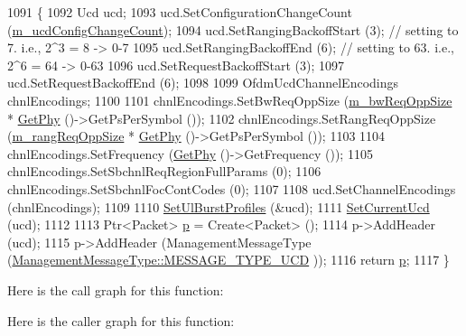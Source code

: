\begin{DoxyCode}
1091 \{
1092   Ucd ucd;
1093   ucd.SetConfigurationChangeCount (\hyperlink{classns3_1_1BaseStationNetDevice_a415c7021411c7acc8f3945acd59a9537}{m\_ucdConfigChangeCount});
1094   ucd.SetRangingBackoffStart (3); \textcolor{comment}{// setting to 7. i.e., 2^3 = 8 -> 0-7}
1095   ucd.SetRangingBackoffEnd (6); \textcolor{comment}{// setting to 63. i.e., 2^6 = 64 -> 0-63}
1096   ucd.SetRequestBackoffStart (3);
1097   ucd.SetRequestBackoffEnd (6);
1098 
1099   OfdmUcdChannelEncodings chnlEncodings;
1100 
1101   chnlEncodings.SetBwReqOppSize (\hyperlink{classns3_1_1BaseStationNetDevice_a15575fd663403b491e36ffe4291ee696}{m\_bwReqOppSize} * \hyperlink{classns3_1_1WimaxNetDevice_a81c1f9d43acfc9cd5d642b784102a21f}{GetPhy} ()->GetPsPerSymbol ());
1102   chnlEncodings.SetRangReqOppSize (\hyperlink{classns3_1_1BaseStationNetDevice_ac4c3cce8984b95e8c708b0402cc697fc}{m\_rangReqOppSize} * \hyperlink{classns3_1_1WimaxNetDevice_a81c1f9d43acfc9cd5d642b784102a21f}{GetPhy} ()->GetPsPerSymbol ());
1103 
1104   chnlEncodings.SetFrequency (\hyperlink{classns3_1_1WimaxNetDevice_a81c1f9d43acfc9cd5d642b784102a21f}{GetPhy} ()->GetFrequency ());
1105   chnlEncodings.SetSbchnlReqRegionFullParams (0);
1106   chnlEncodings.SetSbchnlFocContCodes (0);
1107 
1108   ucd.SetChannelEncodings (chnlEncodings);
1109 
1110   \hyperlink{classns3_1_1BaseStationNetDevice_afe815d0fff8c6152ceeb93beff282255}{SetUlBurstProfiles} (&ucd);
1111   \hyperlink{classns3_1_1WimaxNetDevice_a554e03eca334044a2e3c404ded0916e5}{SetCurrentUcd} (ucd);
1112 
1113   Ptr<Packet> \hyperlink{lte__link__budget_8m_ac9de518908a968428863f829398a4e62}{p} = Create<Packet> ();
1114   p->AddHeader (ucd);
1115   p->AddHeader (ManagementMessageType (\hyperlink{classns3_1_1ManagementMessageType_a0e0c7a1e263538f0379d1bdb015abe3daa447105448b9b6e1e8c4773b9ab56119}{ManagementMessageType::MESSAGE\_TYPE\_UCD}
      ));
1116   \textcolor{keywordflow}{return} \hyperlink{lte__link__budget_8m_ac9de518908a968428863f829398a4e62}{p};
1117 \}
\end{DoxyCode}


Here is the call graph for this function\+:




Here is the caller graph for this function\+:


